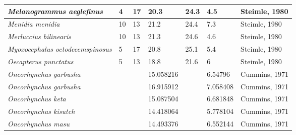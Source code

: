 \documentclass[a4paper]{article} %
\begin{document}
\begin{landscape}
\begin{longtable}[]{|l|p{1.8cm}|p{2cm}|p{2cm}|p{2.15cm}|p{1.9cm}|l|}
    \textit{Melanogrammus aeglefinus}        & 4                            & 17                         & 20.3                          & 24.3                              & 4.5                      & Steimle, 1980                \\ \hline
    \textit{Menidia menidia}                 & 10                           & 13                         & 21.2                          & 24.4                              & 7.3                      & Steimle, 1980                \\ \hline
    \textit{Merluccius bilinearis}           & 10                           & 13                         & 21.3                          & 24.6                              & 4.6                      & Steimle, 1980                \\ \hline
    \textit{Myoxocephalus octodecemspinosus} & 5                            & 17                         & 20.8                          & 25.1                              & 5.4                      & Steimle, 1980                \\ \hline
    \textit{Oecapterus punctatus}            & 5                            & 13                         & 18.8                          & 21.6                              & 6                        & Steimle, 1980                \\ \hline
    \textit{Oncorhynchus garbusha}           &                              &                            & 15.058216                     &                                   & 6.54796                  & Cummins, 1971                 \\ \hline
    \textit{Oncorhynchus garbusha}           &                              &                            & 16.915912                     &                                   & 7.058408                 & Cummins, 1971                 \\ \hline
    \textit{Oncorhynchus keta}               &                              &                            & 15.087504                     &                                   & 6.681848                 & Cummins, 1971                 \\ \hline
    \textit{Oncorhynchus kisutch}            &                              &                            & 14.418064                     &                                   & 5.778104                 & Cummins, 1971                 \\ \hline
    \textit{Oncorhynchus masu}               &                              &                            & 14.493376                     &                                   & 6.552144                 & Cummins, 1971                 \\ \hline

\end{longtable}
\end{landscape}
\end{document}
